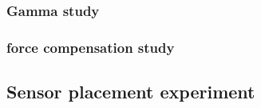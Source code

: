 \subsubsection{Gamma study}
\subsubsection{force compensation study}

\subsection{Sensor placement experiment}
\subsubsection{}



 
